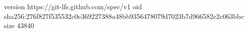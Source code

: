 version https://git-lfs.github.com/spec/v1
oid sha256:276f827f535532c0c369227388a48bb9356478079d7023b7d966582e2c063bbc
size 43840
